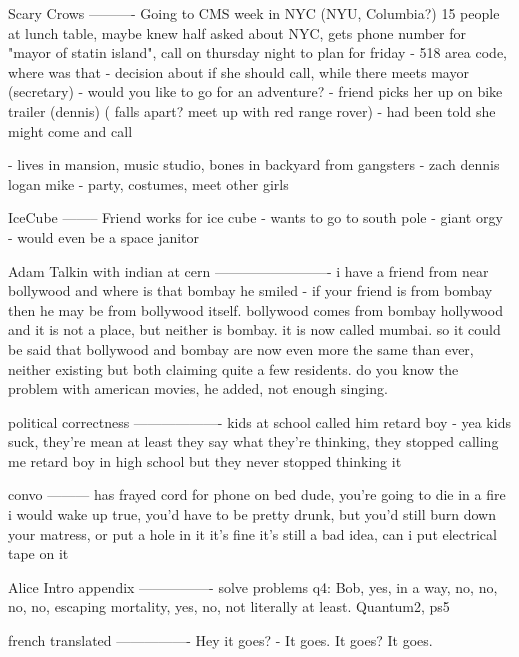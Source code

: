 Scary Crows
----------
Going to CMS week in NYC (NYU, Columbia?)
 15 people at lunch table, maybe knew half
 asked about NYC, gets phone number for "mayor of statin island", call on thursday night to plan for friday
 - 518 area code, where was that
 - decision about if she should call, while there meets mayor (secretary)
  - would you like to go for an adventure?
   - friend picks her up on bike trailer (dennis)
    ( falls apart? meet up with red range rover)
   - had been told she might come and call
   
  - lives in mansion, music studio, bones in backyard from gangsters
  - zach dennis logan mike
  - party, costumes, meet other girls 



IceCube
--------
Friend works for ice cube
 - wants to go to south pole
  - giant orgy
  - would even be a space janitor


Adam Talkin with indian at cern
-------------------------
i have a friend from near bollywood
and where is that
bombay
he smiled - if your friend is from bombay then he may be from bollywood itself. bollywood comes from bombay hollywood and it is not a place, but neither is bombay. it is now called mumbai. so it could be said that bollywood and bombay are now even more the same than ever, neither existing but both claiming quite a few residents. do you know the problem with american movies, he added, not enough singing.

political correctness
-------------------
kids at school called him retard boy 
 - yea kids suck, they're mean
at least they say what they're thinking, they stopped calling me retard boy in high school but they never stopped thinking it


convo
---------
 has frayed cord for phone on bed
 dude, you're going to die in a fire
 i would wake up
 true, you'd have to be pretty drunk, but you'd still burn down your matress, or put a hole in it
 it's fine
 it's still a bad idea, can i put electrical tape on it

Alice Intro appendix
----------------
solve problems
q4: 
Bob, yes, in a way, no, no, no, no, escaping mortality, yes, no, not literally at least.
Quantum2, ps5

french translated
----------------
Hey it goes?
 - It goes. It goes?
It goes.
